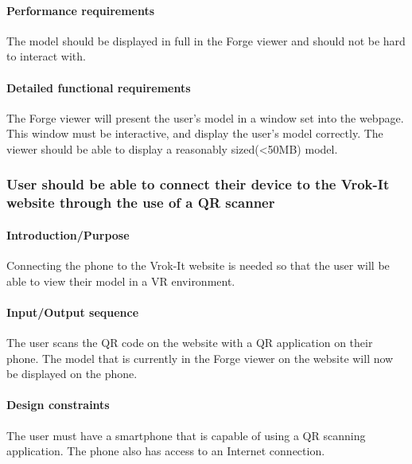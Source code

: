 \documentclass[letterpaper, 10pt, draftclsnofoot, compsoc, onecolumn]{IEEEtran}
\begin{document}
\paragraph[Performance requirements of this
feature]{\rmfamily\bfseries\color{black}
Performance requirements }
{\color{black}
	The model should be displayed in full in the Forge viewer and should not be hard to interact with. 
}

\paragraph[Detailed functional requirements of this
feature]{\rmfamily\bfseries\color{black}
Detailed functional requirements }
{\color{black}
	The Forge viewer will present the user's model in a window set into the webpage. This window must be interactive, and display the 
	user's model correctly. The viewer should be able to display a reasonably sized(<50MB) model. 
}


\subsubsection[{Smartphone Connection}]{\rmfamily\bfseries\color{black} User should be able to connect their 
	device to the Vrok-It website through the use of a QR scanner
}
\smallskip
\paragraph[Introduction/Purpose of this
feature]{\rmfamily\bfseries\color{black}
Introduction/Purpose }
{\color{black}
	Connecting the phone to the Vrok-It website is needed so that the user will be able to view their model in a VR environment. 
}

\paragraph[Input/Output sequence for this
feature]{\rmfamily\bfseries\color{black}
Input/Output sequence }
{\color{black}
	The user scans the QR code on the website with a QR application on their phone. The model that is currently in the Forge viewer on the website will now be displayed on the phone. 
}

\paragraph[Design constraints of this
feature]{\rmfamily\bfseries\color{black} Design
constraints }
{\color{black}
	The user must have a smartphone that is capable of using a QR scanning application. The phone also has access to an Internet 
	connection. 
}
\end{document}
